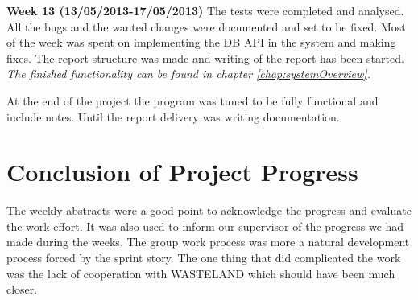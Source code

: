 \textbf{Week 13 (13/05/2013-17/05/2013)}
The tests were completed and analysed. 
All the bugs and the wanted changes were documented and set to be fixed.
Most of the week was spent on implementing the DB API in the system and making fixes.     
The report structure was made and writing of the report has been started. 
\textit{The finished functionality can be found in chapter \vref{chap:systemOverview}.}
 
At the end of the project the program was tuned to be fully functional and include notes.
Until the report delivery was writing documentation.       

\section{Conclusion of Project Progress}
The weekly abstracts were a good point to acknowledge the progress and evaluate the work effort. It was also used to inform our supervisor of the progress we had made during the weeks. 
The group work process was more a natural development process forced by the sprint story.       
The one thing that did complicated the work was the lack of cooperation with WASTELAND which should have been much closer. 
\label{sec:conclusionofProjectProgress}
